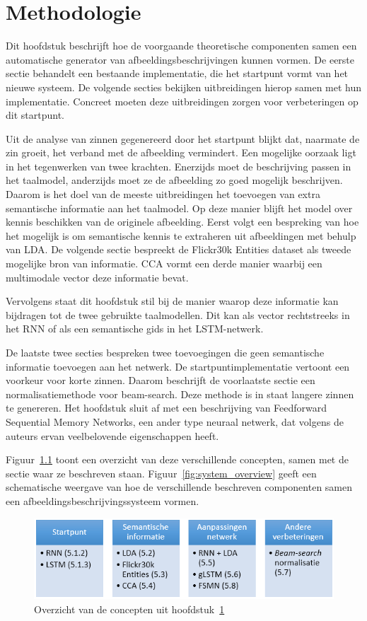\chapter{Methodologie}
\label{hst-meth}
Dit hoofdstuk beschrijft hoe de voorgaande theoretische componenten samen een automatische generator van afbeeldingsbeschrijvingen kunnen vormen. De eerste sectie behandelt een bestaande implementatie, die het startpunt vormt van het nieuwe systeem. De volgende secties bekijken uitbreidingen hierop samen met hun implementatie. Concreet moeten deze uitbreidingen zorgen voor verbeteringen op dit startpunt.

Uit de analyse van zinnen gegenereerd door het startpunt blijkt dat, naarmate de zin groeit, het verband met de afbeelding vermindert. Een mogelijke oorzaak ligt in het tegenwerken van twee krachten. Enerzijds moet de beschrijving passen in het taalmodel, anderzijds moet ze de afbeelding zo goed mogelijk beschrijven. Daarom is het doel van de meeste uitbreidingen het toevoegen van extra semantische informatie aan het taalmodel. Op deze manier blijft het model over kennis beschikken van de originele afbeelding. Eerst volgt een bespreking van hoe het mogelijk is om semantische kennis te extraheren uit afbeeldingen met behulp van LDA. De volgende sectie bespreekt de Flickr30k Entities dataset als tweede mogelijke bron van informatie. CCA vormt een derde manier waarbij een multimodale vector deze informatie bevat.

Vervolgens staat dit hoofdstuk stil bij de manier waarop deze informatie kan bijdragen tot de twee gebruikte taalmodellen. Dit kan als vector rechtstreeks in het RNN of als een semantische gids in het LSTM-netwerk. 

De laatste twee secties bespreken twee toevoegingen die geen semantische informatie toevoegen aan het netwerk. De startpuntimplementatie vertoont een voorkeur voor korte zinnen. Daarom beschrijft de voorlaatste sectie een normalisatiemethode voor beam-search. Deze methode is in staat langere zinnen te genereren. Het hoofdstuk sluit af met een beschrijving van Feedforward Sequential Memory Networks, een ander type neuraal netwerk, dat volgens de auteurs ervan veelbelovende eigenschappen heeft.

Figuur~\ref{fig:methodology_overview} toont een overzicht van deze verschillende concepten, samen met de sectie waar ze beschreven staan. Figuur~\ref{fig:system_overview} geeft een schematische weergave van hoe de verschillende beschreven componenten samen een afbeeldingsbeschrijvingssysteem vormen.
\begin{figure}
\centering
\includegraphics[width=\linewidth]{Images/methodology_overview}
\caption{Overzicht van de concepten uit hoofdstuk~\ref{hst-meth}}
\label{fig:methodology_overview}
\end{figure}


